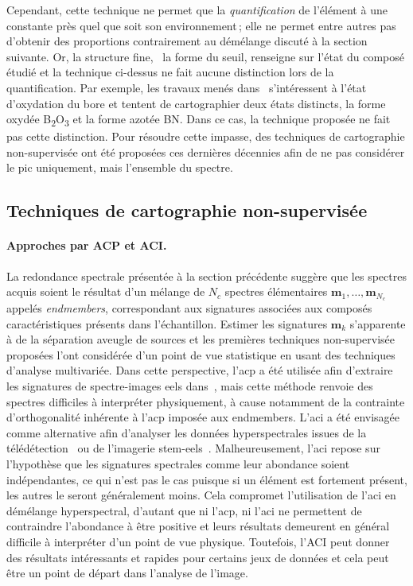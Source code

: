     Cependant, cette technique ne permet que la \emph{quantification} de l'élément à une constante près quel que soit son environnement\,; elle ne permet entre autres pas d'obtenir des proportions contrairement au démélange discuté à la section suivante. Or, la structure fine, \ie\ la forme du seuil, renseigne sur l'état du composé étudié et la technique ci-dessus ne fait aucune distinction lors de la quantification. Par exemple, les travaux menés dans~\cite{dobigeon2012spectral} s'intéressent à l'état d'oxydation du bore et tentent de cartographier deux états distincts, la forme oxydée B\textsubscript{2}O\textsubscript{3} et la forme azotée BN. Dans ce cas, la technique proposée ne fait pas cette distinction.
    Pour résoudre cette impasse, des techniques de cartographie non-supervisée ont été proposées ces dernières décennies afin de ne pas considérer le pic uniquement, mais l'ensemble du spectre.

    

    \subsection{Techniques de cartographie non-supervisée}\label{sec-demelange}
    
    \paragraph{Approches par ACP et ACI.} La redondance spectrale présentée à la section précédente suggère que les spectres acquis soient le résultat d'un mélange de $N_c$ spectres élémentaires $\mathbf{m}_1,\dots,\mathbf{m}_{N_c}$ appelés \emph{endmembers}, correspondant aux signatures associées aux composés caractéristiques présents dans l'échantillon.
    Estimer les signatures $\mathbf{m}_k$ s'apparente à de la séparation aveugle de sources et les premières techniques non-supervisée proposées l'ont considérée d'un point de vue statistique en usant des techniques d'analyse multivariée. Dans cette perspective, l'\gls{acp} a été utilisée afin d'extraire les signatures de spectre-images \gls{eels} dans~\cite{bonnet1999extracting, bosman2006mapping, trebbia1990eels}, mais cette méthode renvoie des spectres difficiles à interpréter physiquement, à cause notamment de la contrainte d'orthogonalité inhérente à l'\gls{acp} imposée aux endmembers. L'\gls{aci} a été envisagée comme alternative afin d'analyser les données hyperspectrales issues de la télédétection~\cite{bayliss1998analyzing, chen1999independent} ou de l'imagerie \gls{stem}-\gls{eels}~\cite{delapena2011mapping, bonnet2005independent, bosman2006mapping}. Malheureusement, l'\gls{aci} repose sur l'hypothèse que les signatures spectrales comme leur abondance soient indépendantes, ce qui n'est pas le cas puisque si un élément est fortement présent, les autres le seront généralement moins. Cela compromet l'utilisation de l'\gls{aci} en démélange hyperspectral, d'autant que ni l'\gls{acp}, ni l'\gls{aci} ne permettent de contraindre l'abondance à être positive et leurs résultats demeurent en général difficile à interpréter d'un point de vue physique. Toutefois, l'ACI peut donner des résultats intéressants et rapides pour certains jeux de données et cela peut être un point de départ dans l'analyse de l'image.
    
